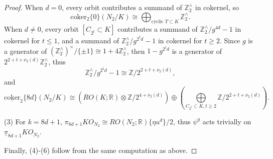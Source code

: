 \documentclass{amsart}
\theoremstyle{plain}
\theoremstyle{definition}
\theoremstyle{remark}
\begin{document}
\begin{proof}
    When $d=0$, every orbit contributes a summand of $\mathbb{Z}_2^\wedge $ in cokernel, so   
    \[
    \mathrm{coker}_2\{0\}(N_2/K)\cong \bigoplus_{\text{cyclic }T\subset K} \mathbb{Z}_2^\wedge.
    \] 
    When $d\neq 0$, every orbit $[C_{2^t}\subset K]$ contributes a summand of $\mathbb{Z}_2^\wedge/g^{4d}-1$ in cokernel for $t\leq 1$, and a summand of $\mathbb{Z}_2^\wedge/g^{2^td}-1$ in cokernel for $t\geq 2$. Since $g$ is a generator of $(\mathbb{Z}_2^\wedge)^\times/\{\pm 1\}\cong 1+4\mathbb{Z}_2^\wedge$, then $1-g^{2^td}$ is a generator of $2^{2+t+\nu_2(d)}\mathbb{Z}_2^\wedge$, thus 
    \[
    \mathbb{Z}_2^\wedge/g^{2^t d}-1\cong \mathbb{Z}/2^{2+t+\nu_2(d)}, 
    \]
    and 
    \[\underline{\mathrm{coker}}_2\{8d\}(N_2/K)\cong (RO(K;\mathbb{R})\otimes \mathbb{Z}/2^{4+\nu_2(d)}) \oplus (\bigoplus\limits_{C_{2^t}\subset K, t\geq 2} \mathbb{Z}/2^{2+t+\nu_2(d)}).\]

    (3) For $k=8d+1$, $\pi_{8d+1} KO_{N_2}\cong RO(N_2;\mathbb{R})\{\eta u^d\}/2$, thus $\psi^g$ acts trivially on $\underline{\pi}_{8d+1}KO_{N_2}$. 
    
    Finally, (4)-(6) follow from the same computation as above.  
\end{proof}
\end{document}

